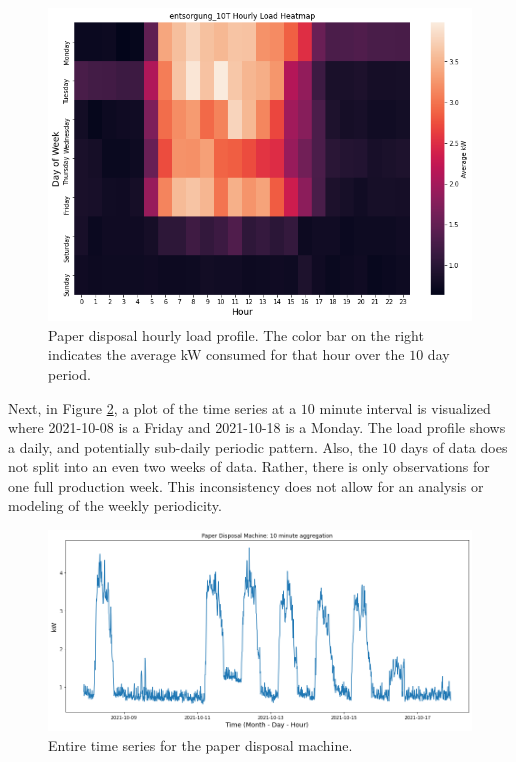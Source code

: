 \begin{figure}[h]
\centering
\graphicspath{ {./images/} }
\includegraphics[scale=0.55]{images/entsorgung_hourly_heatmap.png}
\caption{Paper disposal hourly load profile. The color bar on the right indicates the average kW consumed for that hour over the $10$ day period.}
\label{fig:fig8}
\end{figure}

Next, in Figure \ref{fig:fig9}, a plot of the time series at a $10$ minute interval is visualized where 2021-10-08 is a Friday and 2021-10-18 is a Monday. The load profile shows a daily, and potentially sub-daily periodic pattern. Also, the $10$ days of data does not split into an even two weeks of data. Rather, there is only observations for one full production week. This inconsistency does not allow for an analysis or modeling of the weekly periodicity. 

\begin{figure}[H]
\centering
\graphicspath{ {./images/} }
\includegraphics[scale=0.49]{images/entsorgung_10T_series.png}
\caption{Entire time series for the paper disposal machine.}
\label{fig:fig9}
\end{figure}

